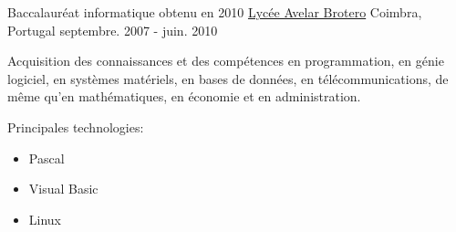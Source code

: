 \begin{cventries}
\cventry
{Baccalauréat informatique obtenu en 2010} %
{\href{http://www.brotero.pt/}{Lycée Avelar Brotero}} %
{Coimbra, Portugal} %
{septembre. 2007 - juin. 2010} %
{  %
\begin{cvitems}
\item {Acquisition des connaissances et des compétences en programmation, en génie logiciel, en systèmes matériels, en bases de données, en télécommunications, de même qu'en mathématiques, en économie et en administration.}
\item{Principales technologies:}
\begin{itemize}
\item Pascal
\item Visual Basic
\item Linux
\end{itemize}
\end{cvitems}
}



\end{cventries}

\pagebreak